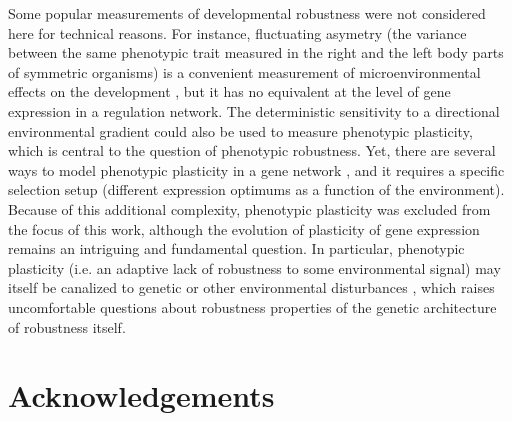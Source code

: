 \documentclass[10pt,a4paper]{article}
\begin{document}
Some popular measurements of developmental robustness were not considered here for technical reasons. For instance, fluctuating asymetry (the variance between the same phenotypic trait measured in the right and the left body parts of symmetric organisms) is a convenient measurement of microenvironmental effects on the development \citep{DD01,LK05}, but it has no equivalent at the level of gene expression in a regulation network. The deterministic sensitivity to a directional environmental gradient could also be used to measure phenotypic plasticity, which is central to the question of phenotypic robustness. Yet, there are several ways to model phenotypic plasticity in a gene network \citep{Mas04,ORL18}, and it requires a specific selection setup (different expression optimums as a function of the environment). Because of this additional complexity, phenotypic plasticity was excluded from the focus of this work, although the evolution of plasticity of gene expression remains an intriguing and fundamental question. In particular, phenotypic plasticity (i.e. an adaptive lack of robustness to some environmental signal) may itself be canalized to genetic or other environmental disturbances \citep{SK94}, which raises uncomfortable questions about robustness properties of the genetic architecture of robustness itself.  

\section*{Acknowledgements}



\printbibliography




\clearpage
\end{document}
